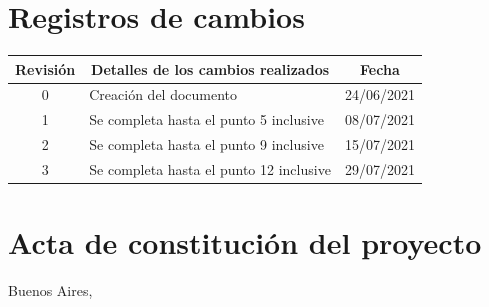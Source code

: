 \documentclass[
11pt, %
]{charter}
\begin{document}
\maketitle
\thispagestyle{empty}
\pagebreak


\thispagestyle{empty}
{\setlength{\parskip}{0pt}
\tableofcontents{}
}
\pagebreak


\section*{Registros de cambios}
\label{sec:registro}


\begin{table}[ht]
\label{tab:registro}
\centering
\begin{tabularx}{\linewidth}{@{}|c|X|c|@{}}
\hline
\rowcolor[HTML]{C0C0C0} 
Revisión & \multicolumn{1}{c|}{\cellcolor[HTML]{C0C0C0}Detalles de los cambios realizados} & Fecha      \\ \hline
0      & Creación del documento                                 & 24/06/2021 \\ \hline
1      & Se completa hasta el punto 5 inclusive                 & 08/07/2021 \\ \hline
2      & Se completa hasta el punto 9 inclusive                 & 15/07/2021 \\ \hline
3      & Se completa hasta el punto 12 inclusive                & 29/07/2021 \\ \hline
\end{tabularx}
\end{table}

\pagebreak



\section*{Acta de constitución del proyecto}
\label{sec:acta}

\begin{flushright}
Buenos Aires, \fechaInicioName
\end{flushright}
\end{document}

